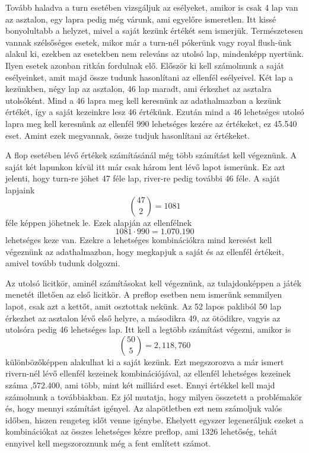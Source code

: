 Tovább haladva a turn esetében vizsgáljuk az esélyeket, amikor is csak 4 lap van az asztalon, egy lapra pedig még várunk, ami egyelőre ismeretlen. Itt kissé bonyolultabb a helyzet, mivel a saját kezünk értékét sem ismerjük. Természetesen vannak szélsőséges esetek, mikor már a turn-nél pókerünk vagy royal flush-ünk alakul ki, ezekben az esetekben nem releváns az utolsó lap, mindenképp nyertünk. Ilyen esetek azonban ritkán fordulnak elő. Először ki kell számolnunk a saját esélyeinket, amit majd össze tudunk hasonlítani az ellenfél esélyeivel. Két lap a kezünkben, négy lap az asztalon, 46 lap maradt, ami érkezhet az asztalra utolsóként. Mind a 46 lapra meg kell keresnünk az adathalmazban a kezünk értékét, így a saját kezeinkre lesz 46 értékünk. Ezután mind a 46 lehetséges utolsó lapra meg kell keresnünk az ellenfél 990 lehetséges kezére az értékeket, ez 45.540 eset. Amint ezek megvannak, össze tudjuk hasonlítani az értékeket.

A flop esetében lévő értékek számításánál még több számítást kell végeznünk. A saját két lapunkon kívül itt már csak három lent lévő lapot ismerünk. Ez azt jelenti, hogy turn-re jöhet 47 féle lap, river-re pedig további 46 féle. A saját lapjaink \[ \binom{47}{2}=1081\] féle képpen jöhetnek le. Ezek alapján az ellenfélnek \[1081\cdot990=1.070.190\] lehetséges keze van. Ezekre a lehetséges kombinációkra mind keresést kell végeznünk az adathalmazban, hogy megkapjuk a saját és az ellenfél értékeit, amivel tovább tudunk dolgozni.

Az utolsó licitkör, aminél számításokat kell végeznünk, az tulajdonképpen a játék menetét illetően az első licitkör. A preflop esetben nem ismerünk semmilyen lapot, csak azt a kettőt, amit osztottak nekünk. Az 52 lapos pakliból 50 lap érkezhet az asztalon lévő első helyre, a másodikra 49, az ötödikre, vagyis az utolsóra pedig 46 lehetséges lap. Itt kell a legtöbb számítást végezni, amikor is \[ \binom{50}{5}=2,118,760\] különbözőképpen alakulhat ki a saját kezünk. Ezt megszorozva a már ismert rivern-nél lévő ellenfél kezeinek kombinációjával, az ellenfél lehetséges kezeinek száma ,572.400, ami több, mint két milliárd eset. Ennyi értékkel kell majd számolnunk a továbbiakban. Ez jól mutatja, hogy milyen összetett a problémakör és, hogy mennyi számítást igényel. Az alapötletben ezt nem számoljuk valós időben, hiszen rengeteg időt venne igénybe. Ehelyett egyszer legeneráljuk ezeket a kombinációkat az összes lehetséges kézre preflop, ami 1326 lehetőség, tehát ennyivel kell megszoroznunk még a fent említett számot.

